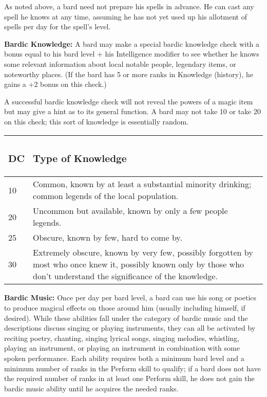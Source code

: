 \documentclass{article}
\begin{document}
As noted above, a bard need not prepare his spells in advance. He can cast any 
spell he knows at any time, assuming he has not yet used up his allotment of spells 
per day for the spell's level. 

\textbf{Bardic Knowledge:} A bard may make a special bardic knowledge check with 
a bonus equal to his bard level + his Intelligence modifier to see whether he knows 
some relevant information about local notable people, legendary items, or noteworthy 
places. (If the bard has 5 or more ranks in Knowledge (history), he gains a +2 
bonus on this check.)

A successful bardic knowledge check will not reveal the powers of a magic item 
but may give a hint as to its general function. A bard may not take 10 or take 
20 on this check; this sort of knowledge is essentially random. 

\vspace{12pt}
\begin{tabular}{|>{\raggedright}p{11pt}|>{\raggedright}p{314pt}|}
\hline
\subsubsection*{D\textbf{C}} & \subsubsection*{T\textbf{ype of Knowledge}}\tabularnewline
\hline
10  & Common, known by at least a substantial minority drinking; common legends 
of the local population.\tabularnewline
\hline
20  & Uncommon but available, known by only a few people legends.\tabularnewline
\hline
25  & Obscure, known by few, hard to come by.\tabularnewline
\hline
30  & Extremely obscure, known by very few, possibly forgotten by most who once 
knew it, possibly known only by those who don't understand the significance of 
the knowledge.\tabularnewline
\hline
\end{tabular}

\vspace{12pt}
\textbf{Bardic Music:} Once per day per bard level, a bard can use his song or 
poetics to produce magical effects on those around him (usually including himself, 
if desired). While these abilities fall under the category of bardic music and 
the descriptions discuss singing or playing instruments, they can all be activated 
by reciting poetry, chanting, singing lyrical songs, singing melodies, whistling, 
playing an instrument, or playing an instrument in combination with some spoken 
performance. Each ability requires both a minimum bard level and a minimum number 
of ranks in the Perform skill to qualify; if a bard does not have the required 
number of ranks in at least one Perform skill, he does not gain the bardic music 
ability until he acquires the needed ranks.
\end{document}
